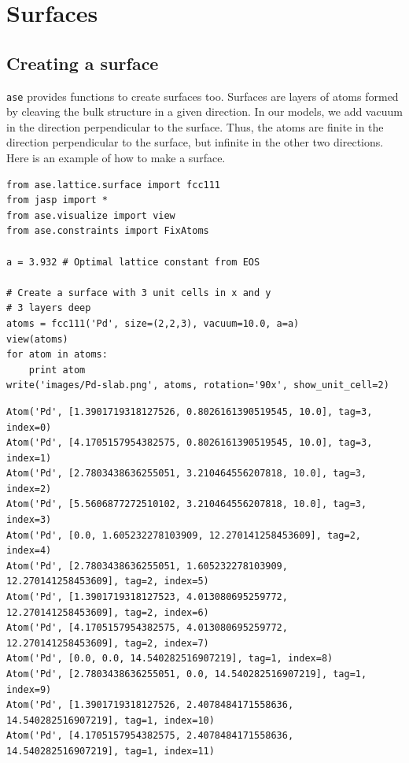 \documentclass[11pt]{article}
\begin{document}
\section{Surfaces}
\label{sec-3}

\subsection{Creating a surface}
\label{sec-3-1}

\texttt{ase} provides functions to create surfaces too. Surfaces are layers of atoms formed by cleaving the bulk structure in a given direction. In our models, we add vacuum in the direction perpendicular to the surface. Thus, the atoms are finite in the direction perpendicular to the surface, but infinite in the other two directions. Here is an example of how to make a surface.

\begin{verbatim}
from ase.lattice.surface import fcc111
from jasp import *
from ase.visualize import view
from ase.constraints import FixAtoms

a = 3.932 # Optimal lattice constant from EOS

# Create a surface with 3 unit cells in x and y
# 3 layers deep
atoms = fcc111('Pd', size=(2,2,3), vacuum=10.0, a=a)
view(atoms)
for atom in atoms:
    print atom
write('images/Pd-slab.png', atoms, rotation='90x', show_unit_cell=2)
\end{verbatim}

\begin{verbatim}
Atom('Pd', [1.3901719318127526, 0.8026161390519545, 10.0], tag=3, index=0)
Atom('Pd', [4.1705157954382575, 0.8026161390519545, 10.0], tag=3, index=1)
Atom('Pd', [2.7803438636255051, 3.210464556207818, 10.0], tag=3, index=2)
Atom('Pd', [5.5606877272510102, 3.210464556207818, 10.0], tag=3, index=3)
Atom('Pd', [0.0, 1.605232278103909, 12.270141258453609], tag=2, index=4)
Atom('Pd', [2.7803438636255051, 1.605232278103909, 12.270141258453609], tag=2, index=5)
Atom('Pd', [1.3901719318127523, 4.013080695259772, 12.270141258453609], tag=2, index=6)
Atom('Pd', [4.1705157954382575, 4.013080695259772, 12.270141258453609], tag=2, index=7)
Atom('Pd', [0.0, 0.0, 14.540282516907219], tag=1, index=8)
Atom('Pd', [2.7803438636255051, 0.0, 14.540282516907219], tag=1, index=9)
Atom('Pd', [1.3901719318127526, 2.4078484171558636, 14.540282516907219], tag=1, index=10)
Atom('Pd', [4.1705157954382575, 2.4078484171558636, 14.540282516907219], tag=1, index=11)
\end{verbatim}
\end{document}
